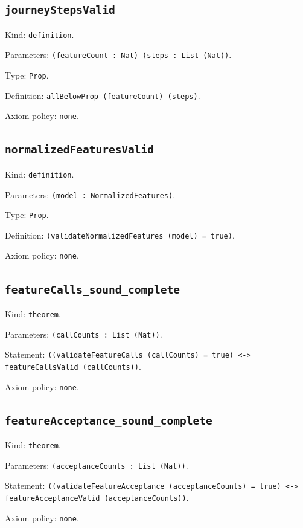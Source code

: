 \documentclass[11pt]{article}
\begin{document}
\subsection*{\texttt{journeyStepsValid}}
\noindent Kind: \texttt{definition}.\par
\noindent Parameters: \texttt{(featureCount : Nat) (steps : List (Nat))}.\par
\noindent Type: \texttt{Prop}.\par
\noindent Definition: \texttt{allBelowProp (featureCount) (steps)}.\par
\noindent Axiom policy: \texttt{none}.\par
\subsection*{\texttt{normalizedFeaturesValid}}
\noindent Kind: \texttt{definition}.\par
\noindent Parameters: \texttt{(model : NormalizedFeatures)}.\par
\noindent Type: \texttt{Prop}.\par
\noindent Definition: \texttt{(validateNormalizedFeatures (model) = true)}.\par
\noindent Axiom policy: \texttt{none}.\par
\subsection*{\texttt{featureCalls\_sound\_complete}}
\noindent Kind: \texttt{theorem}.\par
\noindent Parameters: \texttt{(callCounts : List (Nat))}.\par
\noindent Statement: \texttt{((validateFeatureCalls (callCounts) = true) <-> featureCallsValid (callCounts))}.\par
\noindent Axiom policy: \texttt{none}.\par
\subsection*{\texttt{featureAcceptance\_sound\_complete}}
\noindent Kind: \texttt{theorem}.\par
\noindent Parameters: \texttt{(acceptanceCounts : List (Nat))}.\par
\noindent Statement: \texttt{((validateFeatureAcceptance (acceptanceCounts) = true) <-> featureAcceptanceValid (acceptanceCounts))}.\par
\noindent Axiom policy: \texttt{none}.\par
\end{document}
